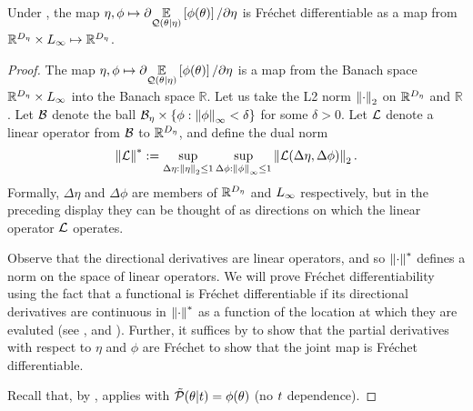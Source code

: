 \begin{lem}

Under , the map $\eta, \phi \mapsto \partial
\underset{\mathcal{Q}(\theta \vert \eta)}{\mathbb{E}}\left[\phi(\theta)\right] / \partial \eta$ is Fr{\'e}chet
differentiable as a map from $\mathbb{R}^{D_{\eta}} \times {L_{\infty}}  \mapsto
\mathbb{R}^{D_{\eta}}$.
%
\begin{proof}
%
The map $\eta, \phi \mapsto  \partial \underset{\mathcal{Q}(\theta \vert
\eta)}{\mathbb{E}}\left[\phi(\theta)\right] / \partial \eta$ is a map from the Banach space
$\mathbb{R}^{D_{\eta}} \times {L_{\infty}}$ into the Banach space $\mathbb{R}$. Let us
take the L2 norm $\left\Vert\cdot\right\Vert_2$ on $\mathbb{R}^{{D_{\eta}}}$ and $\mathbb{R}$.
Let $\mathcal{B}$ denote the ball $\mathcal{B}_\eta \times \{ \phi: \left\Vert\phi\right\Vert_{\infty} <
\delta\}$ for some $\delta > 0$.  Let $\mathcal{L}$ denote a linear operator from
$\mathcal{B}$ to $\mathbb{R}^{D_{\eta}}$, and define the dual norm
%
\begin{align*}
%
\norm{\linop}^* :=
    \sup_{\Delta \eta: \norm{\eta}_2 \le 1}
    \sup_{\Delta \phi: \norminf{\phi} \le 1}
     \norm{\linop(\Delta \eta, \Delta \phi)}_2.
%
\end{align*}
%
Formally, $\Delta \eta$ and $\Delta \phi$ are members of $\mathbb{R}^{D_{\eta}}$
and ${L_{\infty}}$ respectively, but in the preceding display they can be thought of as
directions on which the linear operator $\mathcal{L}$ operates.

Observe that the directional derivatives are linear operators, and so
$\left\Vert\cdot\right\Vert^*$ defines a norm on the space of linear operators. We will prove
Fr{\'e}chet differentiability using the fact that a functional is Fr{\'e}chet
differentiable if its directional derivatives are continuous in $\left\Vert\cdot\right\Vert^*$
as a function of the location at which they are evaluted  (see
\citet[Proposition 4.8(c)]{zeidler:2013:functional}, \citet[Corollary
1.4]{averbukh:1967:theory} and \citep[Appendix A]{reeds:1976:thesis}). Further,
it suffices by \citet[Proposition 4.14(c)]{zeidler:2013:functional} to show that
the partial derivatives with respect to $\eta$ and $\phi$ are Fr{\'e}chet to
show that the joint map is Fr{\'e}chet differentiable.

Recall that, by , 
applies with $\tilde{\mathcal{P}}(\theta \vert t) = \phi(\theta)$ (no $t$ dependence).



\end{proof}
\end{lem}
